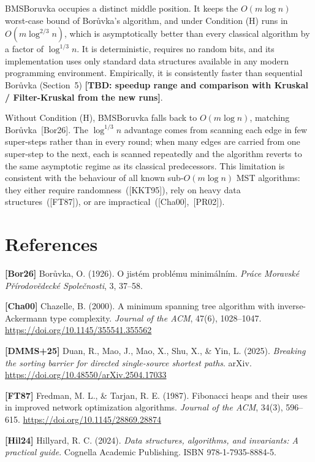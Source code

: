 \documentclass[11pt]{article}
\theoremstyle{plain}
\theoremstyle{remark}
\begin{document}
BMSBoruvka occupies a distinct middle position. It keeps the
\(O(m \log n)\) worst-case bound of Borůvka's algorithm, and under
Condition (H) runs in \(O(m \log^{2/3} n)\), which is asymptotically
better than every classical algorithm by a factor of
\(\log^{1/3} n\). It is deterministic, requires no random bits, and its
implementation uses only standard data structures available in any
modern programming environment. Empirically, it is consistently faster
than sequential Borůvka (Section~5)
\textbf{[TBD: speedup range and comparison with Kruskal /
Filter-Kruskal from the new runs]}.

Without Condition (H), BMSBoruvka falls back to \(O(m \log n)\),
matching Borůvka~{[}Bor26{]}. The \(\log^{1/3} n\) advantage comes from
scanning each edge in few super-steps rather than in every round; when
many edges are carried from one super-step to the next, each is scanned
repeatedly and the algorithm reverts to the same asymptotic regime as
its classical predecessors. This limitation is consistent with the
behaviour of all known sub-\(O(m \log n)\) MST algorithms: they either
require randomness~({[}KKT95{]}), rely on heavy data
structures~({[}FT87{]}), or are impractical~({[}Cha00{]},~{[}PR02{]}).

\section*{References}

\noindent \textbf{{[}Bor26{]}} Borůvka, O. (1926). O jistém problému minimálním.
\emph{Práce Moravské Přírodovědecké Společnosti}, 3, 37--58.
\smallskip


\noindent \textbf{{[}Cha00{]}} Chazelle, B. (2000). A minimum spanning tree
algorithm with inverse-Ackermann type complexity. \emph{Journal of the
ACM}, 47(6), 1028--1047. \url{https://doi.org/10.1145/355541.355562}
\smallskip


\noindent \textbf{{[}DMMS+25{]}} Duan, R., Mao, J., Mao, X., Shu, X., \& Yin, L.
(2025). \emph{Breaking the sorting barrier for directed single-source
shortest paths}. arXiv. \url{https://doi.org/10.48550/arXiv.2504.17033}
\smallskip


\noindent \textbf{{[}FT87{]}} Fredman, M. L., \& Tarjan, R. E. (1987). Fibonacci
heaps and their uses in improved network optimization algorithms.
\emph{Journal of the ACM}, 34(3), 596--615.
\url{https://doi.org/10.1145/28869.28874}
\smallskip


\noindent \textbf{{[}Hil24{]}} Hillyard, R. C. (2024). \emph{Data structures,
algorithms, and invariants: A practical guide}. Cognella Academic
Publishing. ISBN 978-1-7935-8884-5.
\smallskip
\end{document}
